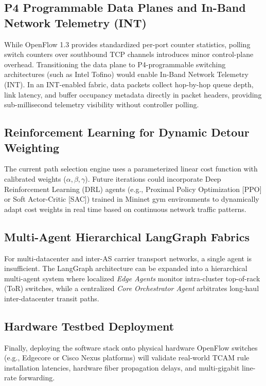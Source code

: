 \subsection{P4 Programmable Data Planes and In-Band Network Telemetry (INT)}
While OpenFlow 1.3 provides standardized per-port counter statistics, polling switch counters over southbound TCP channels introduces minor control-plane overhead. Transitioning the data plane to P4-programmable switching architectures (such as Intel Tofino) would enable In-Band Network Telemetry (INT). In an INT-enabled fabric, data packets collect hop-by-hop queue depth, link latency, and buffer occupancy metadata directly in packet headers, providing sub-millisecond telemetry visibility without controller polling.

\subsection{Reinforcement Learning for Dynamic Detour Weighting}
The current path selection engine uses a parameterized linear cost function with calibrated weights ($\alpha, \beta, \gamma$). Future iterations could incorporate Deep Reinforcement Learning (DRL) agents (e.g., Proximal Policy Optimization [PPO] or Soft Actor-Critic [SAC]) trained in Mininet gym environments to dynamically adapt cost weights in real time based on continuous network traffic patterns.

\subsection{Multi-Agent Hierarchical LangGraph Fabrics}
For multi-datacenter and inter-AS carrier transport networks, a single agent is insufficient. The LangGraph architecture can be expanded into a hierarchical multi-agent system where localized \textit{Edge Agents} monitor intra-cluster top-of-rack (ToR) switches, while a centralized \textit{Core Orchestrator Agent} arbitrates long-haul inter-datacenter transit paths.

\subsection{Hardware Testbed Deployment}
Finally, deploying the software stack onto physical hardware OpenFlow switches (e.g., Edgecore or Cisco Nexus platforms) will validate real-world TCAM rule installation latencies, hardware fiber propagation delays, and multi-gigabit line-rate forwarding.
